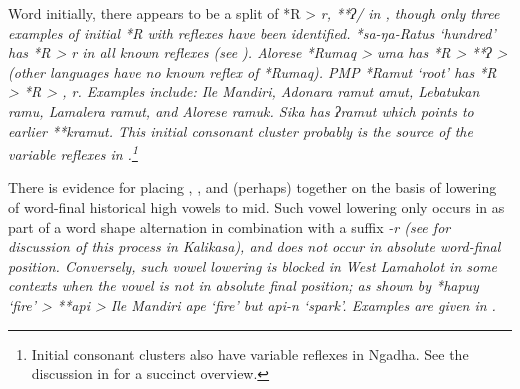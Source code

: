 Word initially, there appears to be a split of *R > \it{r,} **ʔ/{\0}
in , though only three examples of initial *R with reflexes have been identified.
*sa-ŋa-Ratus ‘hundred’ has *R > \it{r} in all known reflexes (see ).
Alorese *Rumaq > \it{uma} has *R > **ʔ > {\0} (other 
languages have no known reflex of *Rumaq).
PMP *Ramut ‘root’ has *R > *R > {\0}, \it{r}.
Examples include: Ile Mandiri,
Adonara \it{ramut {\tl} amut},
Lebatukan \it{ramu}, Lamalera \it{ramut}, and Alorese \it{ramuk}.
Sika has \it{ʔramut} which points to earlier **kramut.
This initial consonant cluster probably is the source of the
variable reflexes in .\footnote{
		Initial consonant clusters also have variable reflexes in Ngadha.
		See the discussion in \citet[83--84]{Elias2018} for a succinct overview.}

There is evidence for placing ,
, and (perhaps)  together
on the basis of lowering of word-final historical high vowels to mid.
Such vowel lowering only occurs in  as
part of a word shape alternation in combination with a suffix
\it{-r} (see \citet[63ff]{Fricke2019} for discussion of this process
in Kalikasa), and does not occur in absolute word-final position.
Conversely, such vowel lowering is blocked in West Lamaholot
in some contexts when the vowel is not in absolute final position;
as shown by *hapuy ‘fire’ > **api > Ile Mandiri \it{ape} ‘fire’ but \it{api-n} ‘spark’.
Examples are given in .

